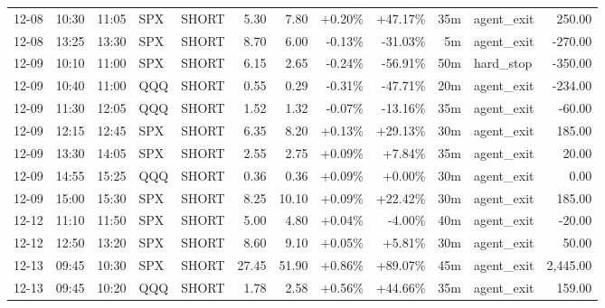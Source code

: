\documentclass[11pt,a4paper,twoside]{article}
\begin{document}
\begin{center}
\begin{longtable}{>{\color{txtmain}}l l l l l r r r r r >{\color{txtmain}}l r}
12-08 & 10:30 & 11:05 & SPX & SHORT & 5.30 & 7.80 & \textcolor{wingreen}{+0.20\%} & \textcolor{wingreen}{+47.17\%} & 35m & agent\_exit & \textcolor{wingreen}{250.00} \\
12-08 & 13:25 & 13:30 & SPX & SHORT & 8.70 & 6.00 & \textcolor{lossred}{-0.13\%} & \textcolor{lossred}{-31.03\%} & 5m & agent\_exit & \textcolor{lossred}{-270.00} \\
12-09 & 10:10 & 11:00 & SPX & SHORT & 6.15 & 2.65 & \textcolor{lossred}{-0.24\%} & \textcolor{lossred}{-56.91\%} & 50m & hard\_stop & \textcolor{lossred}{-350.00} \\
12-09 & 10:40 & 11:00 & QQQ & SHORT & 0.55 & 0.29 & \textcolor{lossred}{-0.31\%} & \textcolor{lossred}{-47.71\%} & 20m & agent\_exit & \textcolor{lossred}{-234.00} \\
12-09 & 11:30 & 12:05 & QQQ & SHORT & 1.52 & 1.32 & \textcolor{lossred}{-0.07\%} & \textcolor{lossred}{-13.16\%} & 35m & agent\_exit & \textcolor{lossred}{-60.00} \\
12-09 & 12:15 & 12:45 & SPX & SHORT & 6.35 & 8.20 & \textcolor{wingreen}{+0.13\%} & \textcolor{wingreen}{+29.13\%} & 30m & agent\_exit & \textcolor{wingreen}{185.00} \\
12-09 & 13:30 & 14:05 & SPX & SHORT & 2.55 & 2.75 & \textcolor{wingreen}{+0.09\%} & \textcolor{wingreen}{+7.84\%} & 35m & agent\_exit & \textcolor{wingreen}{20.00} \\
12-09 & 14:55 & 15:25 & QQQ & SHORT & 0.36 & 0.36 & \textcolor{wingreen}{+0.09\%} & \textcolor{wingreen}{+0.00\%} & 30m & agent\_exit & \textcolor{wingreen}{0.00} \\
12-09 & 15:00 & 15:30 & SPX & SHORT & 8.25 & 10.10 & \textcolor{wingreen}{+0.09\%} & \textcolor{wingreen}{+22.42\%} & 30m & agent\_exit & \textcolor{wingreen}{185.00} \\
12-12 & 11:10 & 11:50 & SPX & SHORT & 5.00 & 4.80 & \textcolor{wingreen}{+0.04\%} & \textcolor{lossred}{-4.00\%} & 40m & agent\_exit & \textcolor{lossred}{-20.00} \\
12-12 & 12:50 & 13:20 & SPX & SHORT & 8.60 & 9.10 & \textcolor{wingreen}{+0.05\%} & \textcolor{wingreen}{+5.81\%} & 30m & agent\_exit & \textcolor{wingreen}{50.00} \\
12-13 & 09:45 & 10:30 & SPX & SHORT & 27.45 & 51.90 & \textcolor{wingreen}{+0.86\%} & \textcolor{wingreen}{+89.07\%} & 45m & agent\_exit & \textcolor{wingreen}{2,445.00} \\
12-13 & 09:45 & 10:20 & QQQ & SHORT & 1.78 & 2.58 & \textcolor{wingreen}{+0.56\%} & \textcolor{wingreen}{+44.66\%} & 35m & agent\_exit & \textcolor{wingreen}{159.00} \\

\end{longtable}
\end{center}
\end{document}
